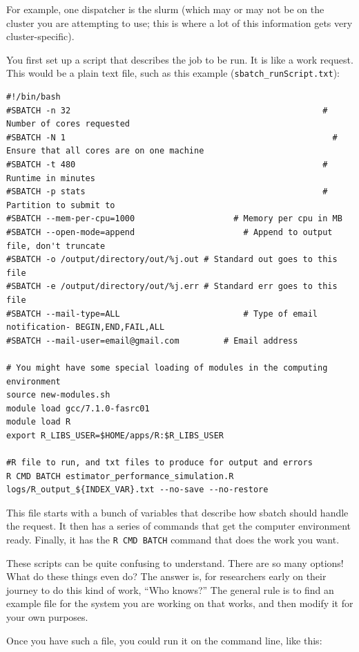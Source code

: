 \documentclass[
]{book}
\begin{document}
For example, one dispatcher is the slurm (which may or may not be on the cluster you are attempting to use; this is where a lot of this information gets very cluster-specific).

You first set up a script that describes the job to be run.
It is like a work request.
This would be a plain text file, such as this example (\texttt{sbatch\_runScript.txt}):

\begin{verbatim}
#!/bin/bash
#SBATCH -n 32                                                   # Number of cores requested
#SBATCH -N 1                                                      # Ensure that all cores are on one machine
#SBATCH -t 480                                                  # Runtime in minutes
#SBATCH -p stats                                                # Partition to submit to
#SBATCH --mem-per-cpu=1000                    # Memory per cpu in MB
#SBATCH --open-mode=append                      # Append to output file, don't truncate
#SBATCH -o /output/directory/out/%j.out # Standard out goes to this file
#SBATCH -e /output/directory/out/%j.err # Standard err goes to this file
#SBATCH --mail-type=ALL                         # Type of email notification- BEGIN,END,FAIL,ALL
#SBATCH --mail-user=email@gmail.com         # Email address

# You might have some special loading of modules in the computing environment
source new-modules.sh
module load gcc/7.1.0-fasrc01
module load R
export R_LIBS_USER=$HOME/apps/R:$R_LIBS_USER

#R file to run, and txt files to produce for output and errors
R CMD BATCH estimator_performance_simulation.R logs/R_output_${INDEX_VAR}.txt --no-save --no-restore
\end{verbatim}

This file starts with a bunch of variables that describe how sbatch should handle the request.
It then has a series of commands that get the computer environment ready.
Finally, it has the \texttt{R\ CMD\ BATCH} command that does the work you want.

These scripts can be quite confusing to understand.
There are so many options!
What do these things even do?
The answer is, for researchers early on their journey to do this kind of work, ``Who knows?''
The general rule is to find an example file for the system you are working on that works, and then modify it for your own purposes.

Once you have such a file, you could run it on the command line, like this:
\end{document}
